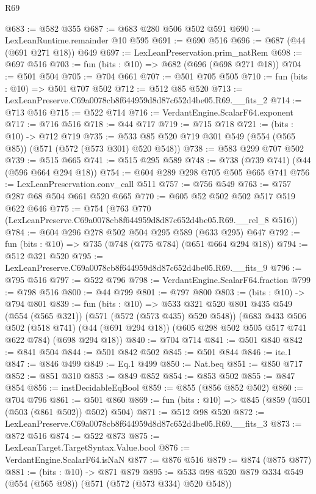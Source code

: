 \begin{lexlean}{R69}
\begin{coremodule}
@683 := @582 @355
@687 := @683 @280 @506 @502 @591
@690 := LexLeanRuntime.remainder @10 @595
@691 := @690 @516
@696 := @687 (@44 (@691 @271 @18)) @649
@697 := LexLeanPreservation.prim_natRem
@698 := @697 @516
@703 := fun (bits : @10) => @682 (@696 (@698 @271 @18))
@704 := @501 @504
@705 := @704 @661
@707 := @501 @705 @505
@710 := fun (bits : @10) => @501 @707 @502
@712 := @512 @85 @520
@713 := LexLeanPreserve.C69a0078cb8f644959d8d87c652d4be05.R69.__fits_2
@714 := @713 @516
@715 := @522 @714
@716 := VerdantEngine.ScalarF64.exponent
@717 := @716 @516
@718 := @44 @717
@719 := @715 @718
@721 := (bits : @10) -> @712 @719
@735 := @533 @85 @520 @719 @301 @549 (@554 (@565 @85)) (@571 (@572 (@573 @301) @520 @548))
@738 := @583 @299 @707 @502
@739 := @515 @665
@741 := @515 @295 @589
@748 := @738 (@739 @741) (@44 (@596 @664 @294 @18))
@754 := @604 @289 @298 @705 @505 @665 @741
@756 := LexLeanPreservation.conv_call @511
@757 := @756 @549
@763 := @757 @287 @68 @504 @661 @520 @665
@770 := @605 @52 @502 @502 @517 @519 @622 @646
@775 := @754 (@763 @770 (LexLeanPreserve.C69a0078cb8f644959d8d87c652d4be05.R69.__rel_8 @516))
@784 := @604 @296 @278 @502 @504 @295 @589 (@633 @295) @647
@792 := fun (bits : @10) => @735 (@748 (@775 @784) (@651 @664 @294 @18))
@794 := @512 @321 @520
@795 := LexLeanPreserve.C69a0078cb8f644959d8d87c652d4be05.R69.__fits_9
@796 := @795 @516
@797 := @522 @796
@798 := VerdantEngine.ScalarF64.fraction
@799 := @798 @516
@800 := @44 @799
@801 := @797 @800
@803 := (bits : @10) -> @794 @801
@839 := fun (bits : @10) =>
  @533
    @321
    @520
    @801
    @435
    @549
    (@554 (@565 @321))
    (@571 (@572 (@573 @435) @520 @548))
    (@683
      @433
      @506
      @502
      (@518 @741)
      (@44 (@691 @294 @18))
      (@605 @298 @502 @505 @517 @741 @622 @784)
      (@698 @294 @18))
@840 := @704 @714
@841 := @501 @840
@842 := @841 @504
@844 := @501 @842 @502
@845 := @501 @844
@846 := ite.{1}
@847 := @846 @499
@849 := Eq.{1} @499
@850 := Nat.beq
@851 := @850 @717
@852 := @851 @310
@853 := @849 @852
@854 := @853 @502
@855 := @847 @854
@856 := instDecidableEqBool
@859 := @855 (@856 @852 @502)
@860 := @704 @796
@861 := @501 @860
@869 := fun (bits : @10) => @845 (@859 (@501 (@503 (@861 @502)) @502) @504)
@871 := @512 @98 @520
@872 := LexLeanPreserve.C69a0078cb8f644959d8d87c652d4be05.R69.__fits_3
@873 := @872 @516
@874 := @522 @873
@875 := LexLeanTarget.TargetSyntax.Value.bool
@876 := VerdantEngine.ScalarF64.isNaN
@877 := @876 @516
@879 := @874 (@875 @877)
@881 := (bits : @10) -> @871 @879
@895 := @533 @98 @520 @879 @334 @549 (@554 (@565 @98)) (@571 (@572 (@573 @334) @520 @548))

\end{coremodule}
\end{lexlean}
